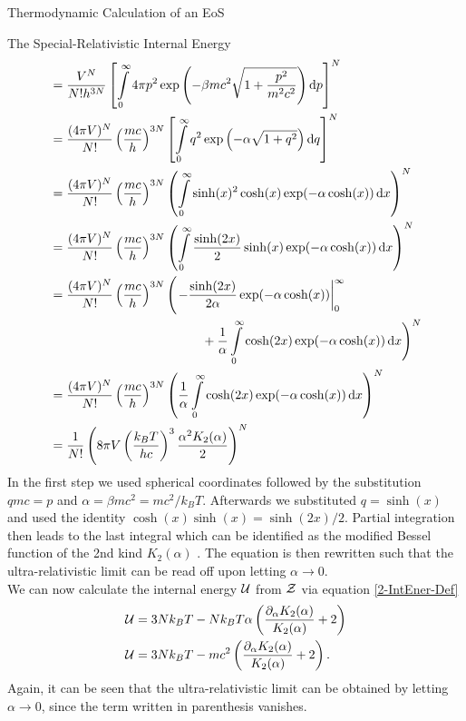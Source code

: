 \begin{section}{Thermodynamic Calculation of an EoS}
\begin{subsection}{The Special-Relativistic Internal Energy}
\begin{align}
		&= \frac{V^N}{N!h^{3N}}\left[\int\limits_0^\infty 4\pi p^2\exp\left(-\beta mc^2\sqrt{1+\frac{p^2}{m^2c^2}} \right)\diff p\right]^N\\
		&= \frac{(4\pi V)^N}{N!}\left(\frac{mc}{h}\right)^{3N}\left[\int\limits_0^\infty q^2\exp\left(-\alpha\sqrt{1+q^2}\right)\diff q\right]^N\\
		&= \frac{(4\pi V)^N}{N!}\left(\frac{mc}{h}\right)^{3N}\left(\int\limits_0^\infty\sinh(x)^2\cosh(x)\exp(-\alpha\cosh(x))\diff x \right)^N\\
		&= \frac{(4\pi V)^N}{N!}\left(\frac{mc}{h}\right)^{3N}\left(\int\limits_0^\infty\frac{\sinh(2x)}{2}\sinh(x)\exp(-\alpha\cosh(x))\diff x \right)^N\\
		&= \frac{(4\pi V)^N}{N!}\left(\frac{mc}{h}\right)^{3N}\Biggl(\left.-\frac{\sinh(2x)}{2\alpha}\exp(-\alpha\cosh(x))\right|_0^\infty\\
		&\hspace{12em} + \frac{1}{\alpha}\int\limits_0^\infty\cosh(2x)\exp(-\alpha\cosh(x))\diff x  \Biggr)^N\\
		&= \frac{(4\pi V)^N}{N!}\left(\frac{mc}{h}\right)^{3N}\left(\frac{1}{\alpha}\int\limits_0^\infty\cosh(2x)\exp(-\alpha\cosh(x))\diff x  \right)^N\\
		&= \frac{1}{N!}\left(8\pi V\left(\frac{k_BT}{hc}\right)^{3}\frac{\alpha^2K_2(\alpha)}{2}\right)^N
		\label{2-IntEner-PartFunc}
\end{align}
In the first step we used spherical coordinates followed by the substitution $qmc=p$ and $\alpha=\beta mc^2=mc^2/k_BT$. Afterwards we substituted $q=\sinh(x)$ and used the identity $\cosh(x)\sinh(x)=\sinh(2x)/2$. Partial integration then leads to the last integral which can be identified as the modified Bessel function of the 2nd kind $K_2(\alpha)$ \cite{abramowitzPocketbookMathematicalFunctions1984}. The equation is then rewritten such that the ultra-relativistic limit can be read off upon letting $\alpha\rightarrow0$.\\ %
We can now calculate the internal energy $\mathcal{U}$ from $\mathcal{Z}$ via equation \eqref{2-IntEner-Def}
\begin{align}
    \mathcal{U} &= 3Nk_BT - Nk_BT\alpha\left(\frac{\partial_\alpha K_2(\alpha)}{K_2(\alpha)}+2\right)\\
    \mathcal{U} &= 3Nk_BT - mc^2\left(\frac{\partial_\alpha K_2(\alpha)}{K_2(\alpha)}+2\right).
    \label{2-IntEner-InternelEnergyExplicit}
\end{align}
Again, it can be seen that the ultra-relativistic limit can be obtained by letting $\alpha\rightarrow0$, since the term written in parenthesis vanishes.

\end{subsection}
\end{section}
